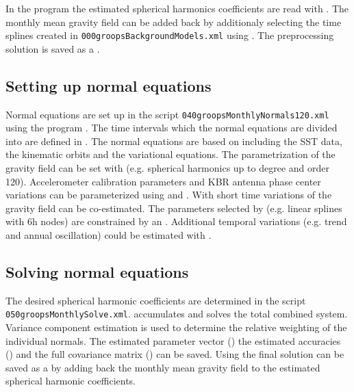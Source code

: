In the program  the estimated spherical harmonics
coefficients are read with
.
The monthly mean gravity field can be added back by additionaly selecting the time splines created
in \verb|000groopsBackgroundModels.xml| using
. The preprocessing solution
is saved as a .

\subsection{Setting up normal equations}\label{cookbook.gravityFieldGrace:monthlyNormals}
Normal equations are set up in the script \verb|040groopsMonthlyNormals120.xml| using
the program . The time intervals which the normal
equations are divided into are defined in .
The normal equations are based on  including the SST data,
the kinematic orbits and the variational equations. The parametrization of the gravity field can
be set with 
(e.g. spherical harmonics up to degree and order 120). Accelerometer calibration parameters
and KBR antenna phase center variations can be parameterized using
 and
.
With  short time variations of the gravity
field can be co-estimated. The parameters selected by
 (e.g. linear splines with 6h nodes) are
constrained by an .
Additional temporal variations (e.g. trend and annual oscillation) could be estimated with
.

\subsection{Solving normal equations}\label{cookbook.gravityFieldGrace:monhtlySolve}
The desired spherical harmonic coefficients are determined in the script \verb|050groopsMonthlySolve.xml|.
 accumulates  and solves
the total combined system. Variance component estimation is used to determine the relative weighting
of the individual normals. The estimated parameter vector ()
the estimated accuracies () and the full covariance matrix
() can be saved.
Using  the final solution can be saved as
a  by adding back the monthly mean gravity
field to the estimated spherical harmonic coefficients.

